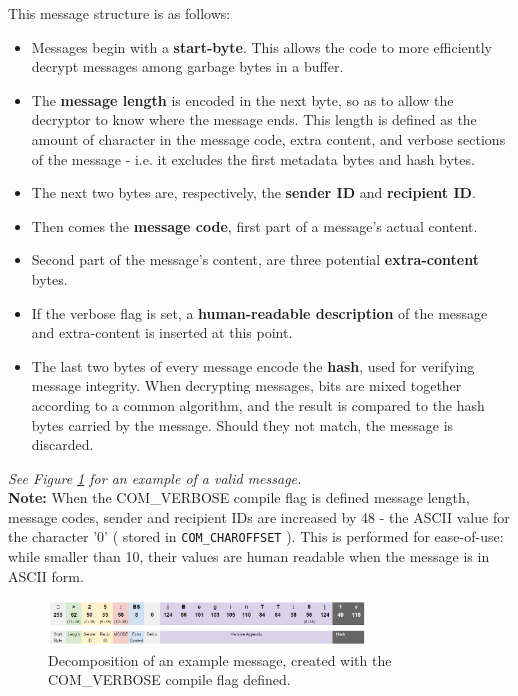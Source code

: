This message structure is as follows:
\begin{itemize}
\item[] Messages begin with a \textbf{start-byte}. This allows the code to more efficiently decrypt messages among garbage bytes in a buffer.
\item[] The \textbf{message length} is encoded in the next byte, so as to allow the decryptor to know where the message ends. This length is defined as the amount of character in the message code, extra content, and verbose sections of the message - i.e. it excludes the first metadata bytes and hash bytes.
\item[] The next two bytes are, respectively, the \textbf{sender ID} and \textbf{recipient ID}.
\item[] Then comes the \textbf{message code}, first part of a message's actual content.
\item[] Second part of the message's content, are three potential \textbf{extra-content} bytes.
\item[] If the verbose flag is set, a \textbf{human-readable description} of the message and extra-content is inserted at this point.
\item[] The last two bytes of every message encode the \textbf{hash}, used for verifying message integrity. When decrypting messages, bits are mixed together according to a common algorithm, and the result is compared to the hash bytes carried by the message. Should they not match, the message is discarded.
\end{itemize}

\textit{See Figure \ref{img:Message} for an example of a valid message.}\\

\textbf{Note:} When the COM\_VERBOSE compile flag is defined message length, message codes, sender and recipient IDs are increased by 48 - the ASCII value for the character '0' ( stored in \texttt{COM\_CHAROFFSET} ). This is performed for ease-of-use: while smaller than 10, their values are human readable when the message is in ASCII form. \\

\begin{figure}[ht]
   \centering
   \includegraphics[width=0.75\textwidth]{img/Message.png}
   \caption{Decomposition of an example message, created with the COM\_VERBOSE compile flag defined.}
   \label{img:Message}
\end{figure}

